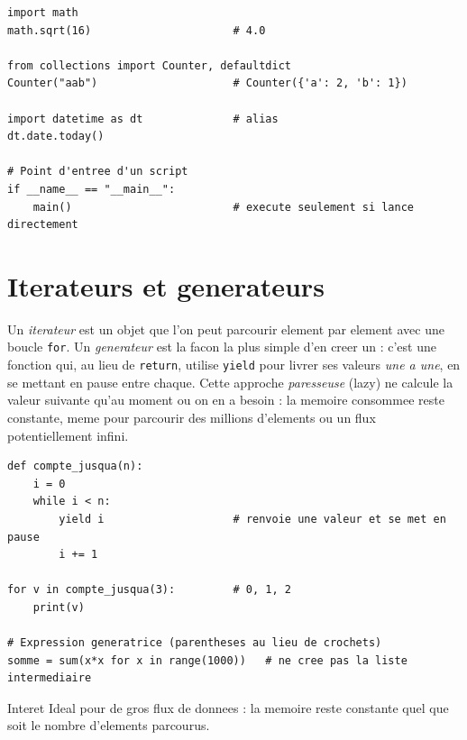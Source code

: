\documentclass[11pt,a4paper]{article}
\begin{document}
\begin{lstlisting}
import math
math.sqrt(16)                      # 4.0

from collections import Counter, defaultdict
Counter("aab")                     # Counter({'a': 2, 'b': 1})

import datetime as dt              # alias
dt.date.today()

# Point d'entree d'un script
if __name__ == "__main__":
    main()                         # execute seulement si lance directement
\end{lstlisting}

\section{Iterateurs et generateurs}
Un \emph{iterateur} est un objet que l'on peut parcourir element par element avec
une boucle \texttt{for}. Un \emph{generateur} est la facon la plus simple d'en
creer un : c'est une fonction qui, au lieu de \texttt{return}, utilise
\texttt{yield} pour livrer ses valeurs \emph{une a une}, en se mettant en pause
entre chaque. Cette approche \emph{paresseuse} (lazy) ne calcule la valeur
suivante qu'au moment ou on en a besoin : la memoire consommee reste constante,
meme pour parcourir des millions d'elements ou un flux potentiellement infini.

\begin{lstlisting}
def compte_jusqua(n):
    i = 0
    while i < n:
        yield i                    # renvoie une valeur et se met en pause
        i += 1

for v in compte_jusqua(3):         # 0, 1, 2
    print(v)

# Expression generatrice (parentheses au lieu de crochets)
somme = sum(x*x for x in range(1000))   # ne cree pas la liste intermediaire
\end{lstlisting}

\begin{infobox}{Interet}
Ideal pour de gros flux de donnees : la memoire reste constante quel que soit le
nombre d'elements parcourus.
\end{infobox}

\end{document}
